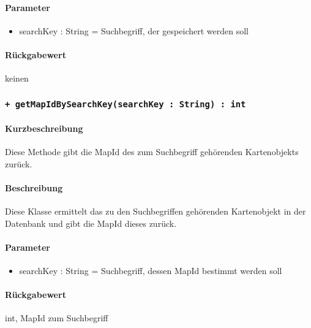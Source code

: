 \paragraph*{Parameter}
\begin{itemize}
    \item searchKey : String = Suchbegriff, der gespeichert werden soll
\end{itemize}
\paragraph*{Rückgabewert}
keinen

\subsubsection{\texttt{+ getMapIdBySearchKey(searchKey : String) : int}}%
\paragraph*{Kurzbeschreibung}
Diese Methode gibt die MapId des zum Suchbegriff gehörenden Kartenobjekts zurück.
\paragraph*{Beschreibung}
Diese Klasse ermittelt das zu den Suchbegriffen gehörenden Kartenobjekt in der Datenbank und gibt die MapId dieses zurück.
\paragraph*{Parameter}
\begin{itemize}
    \item searchKey : String = Suchbegriff, dessen MapId bestimmt werden soll
\end{itemize}
\paragraph*{Rückgabewert}
int, MapId zum Suchbegriff